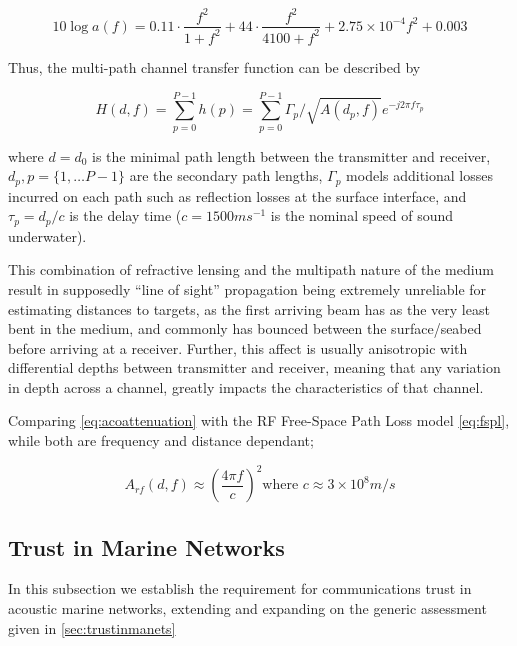 \documentclass[runningheads,a4paper]{llncs}
\begin{document}
\begin{equation}
  \label{eq:thorp}
  10 \log a(f) = 0.11 \cdot \frac{f^2}{1+f^2} + 44\cdot\frac{f^2}{4100+f^2}+ 2.75\times10^{-4} f^2 + 0.003
\end{equation}


Thus, the multi-path channel transfer function can be described by 

\begin{equation}
  \label{eq:acomultipath}
  H(d,f) =\sum_{p=0}^{P-1} h(p) = \sum_{p=0}^{P-1} \Gamma_p / \sqrt{A(d_p,f)}e^{-j 2 \pi f \tau_p}
\end{equation}

where $d=d_0$ is the minimal path length between the transmitter and receiver, $d_p,p=\{1,\dots P-1\}$ are the secondary path lengths, $\Gamma_p$ models additional losses incurred on each path such as reflection losses at the surface interface, and $\tau_p = d_p/c$ is the delay time ($c = 1500 ms^{-1}$ is the nominal speed of sound underwater).


This combination of refractive lensing and the multipath nature of the medium result in supposedly ``line of sight'' propagation being extremely unreliable for estimating distances to targets, as the first arriving beam has as the very least bent in the medium, and commonly has bounced between the surface/seabed before arriving at a receiver.
Further, this affect is usually anisotropic with differential depths between transmitter and receiver, meaning that any variation in depth across a channel, greatly impacts the characteristics of that channel.

Comparing \eqref{eq:acoattenuation} with the RF Free-Space Path Loss model \eqref{eq:fspl}, while both are frequency and distance dependant; 

\begin{equation}
  \label{eq:fspl}
  A_{rf}(d,f) \approx \left( \frac{4\pi f}{c} \right)^2
  \text{where }c\approx 3\times10^8m/s
\end{equation}



\subsection{Trust in Marine Networks}

In this subsection we establish the requirement for communications trust in acoustic marine networks, extending and expanding on the generic assessment given in \ref{sec:trustinmanets}
\end{document}
